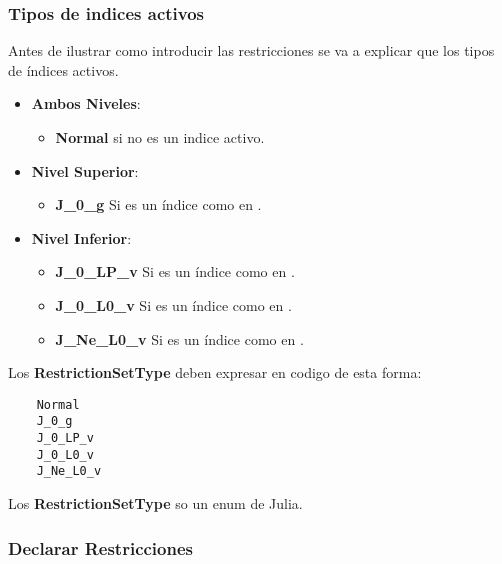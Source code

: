 \subsubsection{Tipos de indices activos}
Antes de ilustrar como introducir las restricciones se va a explicar 
que los tipos de índices activos.

\begin{itemize}
    \item \textbf{Ambos Niveles}:
        \begin{itemize}
            \item \textbf{Normal} si no es un indice activo.
        \end{itemize}
    \item \textbf{Nivel Superior}:
     \begin{itemize}
        \item \textbf{J\_0\_g} Si es un índice como en .
     \end{itemize}
    \item \textbf{Nivel Inferior}:
    \begin{itemize}
        \item \textbf{J\_0\_LP\_v} Si es un índice como en .
        \item  \textbf{J\_0\_L0\_v} Si es un índice como en .
        \item  \textbf{J\_Ne\_L0\_v} Si es un índice como en .
    \end{itemize}
\end{itemize}

Los \textbf{RestrictionSetType} deben expresar en codigo de esta forma:
\begin{lstlisting}
    Normal 
    J_0_g 
    J_0_LP_v
    J_0_L0_v
    J_Ne_L0_v
\end{lstlisting}

Los \textbf{RestrictionSetType} so un enum de Julia.

\subsubsection{Declarar Restricciones}

